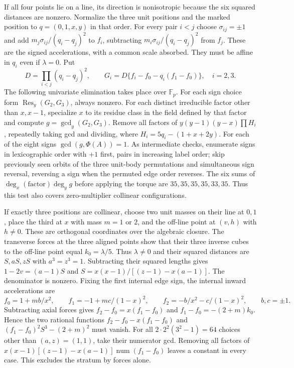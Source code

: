 \documentclass[11pt,letterpaper]{article}
\theoremstyle{definition}
\begin{document}
If all four points lie on a line, its direction is nonisotropic
because the six squared distances are nonzero. Normalize the three
unit positions and the marked position to $q=(0,1,x,y)$ in that
order. For every pair $i<j$ choose $\sigma_{ij}=\pm1$ and add
$m_j\sigma_{ij}/(q_i-q_j)^2$ to $f_i$, subtracting
$m_i\sigma_{ij}/(q_i-q_j)^2$ from $f_j$. These are the signed
accelerations, with a common scale absorbed. They must be affine in
$q_i$ even if $\lambda=0$. Put
\[
 D=\prod_{i<j}(q_i-q_j)^2,\qquad
 G_i=D\{f_i-f_0-q_i(f_1-f_0)\},\quad i=2,3 .
\]
The following univariate elimination takes place over $\mathbb F_p$.
For each sign choice form $\operatorname{Res}_y(G_2,G_3)$, always
nonzero. For each distinct irreducible factor other than $x,x-1$,
specialize $x$ to its residue class in the field defined by that
factor and compute $g=\gcd_y(G_2,G_3)$. Remove all factors of
$y(y-1)(y-x)\prod H_i$, repeatedly taking gcd and dividing, where
$H_i=5q_i-(1+x+2y)$. For each of the eight signs
$\gcd(g,\Phi(A))=1$. As intermediate checks, enumerate signs in
lexicographic order with $+1$ first, pairs in increasing label order;
skip previously seen orbits of the three unit-body permutations and
simultaneous sign reversal, reversing a sign when the permuted edge
order reverses. The six sums of $\deg_x(\mathrm{factor})\deg_y g$
before applying the torque are $35,35,35,35,33,35$. Thus this test
also covers zero-multiplier collinear configurations.

If exactly three positions are collinear, choose two unit masses on
their line at $0,1$, place the third at $x$ with mass $m=1$ or $2$,
and the off-line point at $(v,h)$ with $h\ne0$. These are orthogonal
coordinates over the algebraic closure. The transverse forces at
the three aligned points show that their three inverse cubes to the
off-line point equal $k_0=\lambda/5$. Thus $\lambda\ne0$ and their
squared distances are $S,aS,zS$ with $a^3=z^3=1$. Subtracting their
squared lengths gives $1-2v=(a-1)S$ and
$S=x(x-1)/[(z-1)-x(a-1)]$. The denominator is nonzero. Fixing the
first internal edge sign, the internal inward accelerations are
\[
 f_0=1+mb/x^2,\qquad f_1=-1+mc/(1-x)^2,\qquad
 f_2=-b/x^2-c/(1-x)^2,\qquad b,c=\pm1 .
\]
Subtracting axial forces gives $f_2-f_0=x(f_1-f_0)$ and
$f_1-f_0=-(2+m)k_0$. Hence the two rational functions
$f_2-f_0-x(f_1-f_0)$ and $(f_1-f_0)^2 S^3-(2+m)^2$ must vanish.
For all $2\cdot 2^2(3^2-1)=64$ choices other than $(a,z)=(1,1)$,
take their numerator gcd. Removing all factors of
$x(x-1)[(z-1)-x(a-1)]\operatorname{num}(f_1-f_0)$ leaves a
constant in every case. This excludes the stratum by forces alone.
\end{document}
